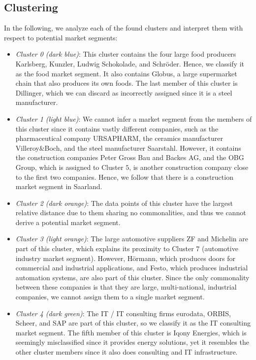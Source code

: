 \documentclass[conference]{IEEEtran}
\begin{document}
\subsection{Clustering}
In the following, we analyze each of the found clusters and interpret them with respect to potential market segments:
\begin{itemize}
    \item \textit{Cluster 0 (dark blue)}: This cluster contains the four large food producers Karlsberg, Kunzler, Ludwig Schokolade, and Schröder. Hence, we classify it as the food market segment. It also contains Globus, a large supermarket chain that also produces its own foods. The last member of this cluster is Dillinger, which we can discard as incorrectly assigned since it is a steel manufacturer.

    \item \textit{Cluster 1 (light blue)}: We cannot infer a market segment from the members of this cluster since it contains vastly different companies, such as the pharmaceutical company URSAPHARM, the ceramics manufacturer Villeroy\&Boch, and the steel manufacturer Saarstahl. However, it contains the construction companies Peter Gross Bau and Backes AG, and the OBG Group, which is assigned to Cluster $5$, is another construction company close to the first two companies. Hence, we follow that there is a construction market segment in Saarland.

    \item \textit{Cluster 2 (dark orange)}: The data points of this cluster have the largest relative distance due to them sharing no commonalities, and thus we cannot derive a potential market segment.

    \item \textit{Cluster 3 (light orange)}: The large automotive suppliers ZF and Michelin are part of this cluster, which explains its proximity to Cluster $7$ (automotive industry market segment). However, Hörmann, which produces doors for commercial and industrial applications, and Festo, which produces industrial automation systems, are also part of this cluster. Since the only commonality between these companies is that they are large, multi-national, industrial companies, we cannot assign them to a single market segment.

    \item \textit{Cluster 4 (dark green)}: The IT / IT consulting firms eurodata, ORBIS, Scheer, and SAP are part of this cluster, so we classify it as the IT consulting market segment. The fifth member of this cluster is Iqony Energies, which is seemingly misclassified since it provides energy solutions, yet it resembles the other cluster members since it also does consulting and IT infrastructure.


\end{itemize}
\end{document}
